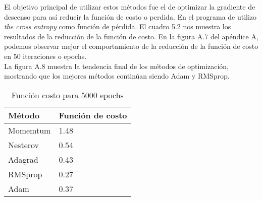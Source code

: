 El objetivo principal de utilizar estos métodos fue el de optimizar la gradiente de descenso para así reducir la función de costo o perdida. En el programa de utilizo \textit{the cross entropy} como función de pérdida.
El cuadro 5.2 nos muestra los resultados de la reducción de la función de costo. En la figura A.7 del apéndice A, podemos observar mejor el comportamiento de la reducción de la función de costo en 50 iteraciones o epochs.\\
La figura A.8 muestra la tendencia final de los métodos de optimización, mostrando que los mejores métodos continúan siendo Adam y RMSprop. 
\begin{table}[H]
	\centering
	\caption{Función costo para 5000 epochs}
	\label{my-label}
	\begin{centering}
		\begin{tabular}{@{}ll@{}}
			\toprule
			Método& Función de costo\\ \midrule
			Momemtum& 1.48 \\
			Nesterov& 0.54 \\
			Adagrad&0.43   \\
			RMSprop& 0.27 \\
			Adam& 0.37 \\ \bottomrule
		\end{tabular}
	\end{centering}
	
\end{table}

